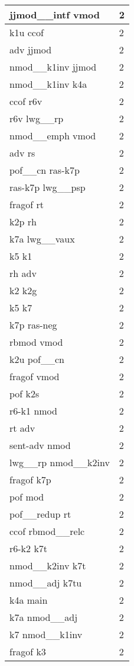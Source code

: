 \documentclass[a4 paper]{article}
\begin{document}
\begin{longtable}{p{}p{}}
jjmod\_\_intf vmod  & 2 \\ \midrule
k1u ccof  & 2 \\ \midrule
adv jjmod  & 2 \\ \midrule
nmod\_\_k1inv jjmod  & 2 \\ \midrule
nmod\_\_k1inv k4a  & 2 \\ \midrule
ccof r6v  & 2 \\ \midrule
r6v lwg\_\_rp  & 2 \\ \midrule
nmod\_\_emph vmod  & 2 \\ \midrule
adv rs  & 2 \\ \midrule
pof\_\_cn ras-k7p  & 2 \\ \midrule
ras-k7p lwg\_\_psp  & 2 \\ \midrule
fragof rt  & 2 \\ \midrule
k2p rh  & 2 \\ \midrule
k7a lwg\_\_vaux  & 2 \\ \midrule
k5 k1  & 2 \\ \midrule
rh adv  & 2 \\ \midrule
k2 k2g  & 2 \\ \midrule
k5 k7  & 2 \\ \midrule
k7p ras-neg  & 2 \\ \midrule
rbmod vmod  & 2 \\ \midrule
k2u pof\_\_cn  & 2 \\ \midrule
fragof vmod  & 2 \\ \midrule
pof k2s  & 2 \\ \midrule
r6-k1 nmod  & 2 \\ \midrule
rt adv  & 2 \\ \midrule
sent-adv nmod  & 2 \\ \midrule
lwg\_\_rp nmod\_\_k2inv  & 2 \\ \midrule
fragof k7p  & 2 \\ \midrule
pof mod  & 2 \\ \midrule
pof\_\_redup rt  & 2 \\ \midrule
ccof rbmod\_\_relc  & 2 \\ \midrule
r6-k2 k7t  & 2 \\ \midrule
nmod\_\_k2inv k7t  & 2 \\ \midrule
nmod\_\_adj k7tu  & 2 \\ \midrule
k4a main  & 2 \\ \midrule
k7a nmod\_\_adj  & 2 \\ \midrule
k7 nmod\_\_k1inv  & 2 \\ \midrule
fragof k3  & 2 \\ \midrule

\end{longtable}
\end{document}
